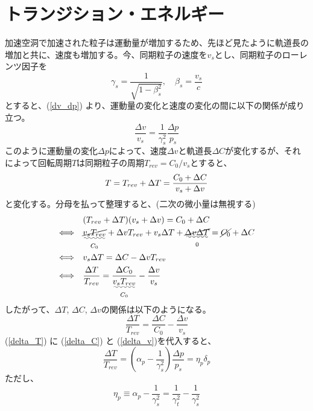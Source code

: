 \documentclass[]{jlreq}
\begin{document}
\section{トランジション・エネルギー}
加速空洞で加速された粒子は運動量が増加するため、先ほど見たように軌道長の増加と共に、速度も増加する。今、同期粒子の速度を$v_s$とし、同期粒子のローレンツ因子を
%
\begin{equation}
  \gamma_s = \frac{1}{\sqrt{1 - \beta_s^2}}, \quad \beta_s = \frac{v_s}{c}
\end{equation}
%
とすると、(\ref{dv_dp}) より、運動量の変化と速度の変化の間に以下の関係が成り立つ。
%
\begin{equation}
  \frac{\Delta v}{v_s}=\frac{1}{\gamma_s^2}\frac{\Delta p}{p_s}
  \label{delta_v}
\end{equation}
%
このように運動量の変化$\Delta p$によって、速度$\Delta v$と軌道長$\Delta C$が変化するが、それによって回転周期$T$は同期粒子の周期$T_{rev}=C_0/v_s$とすると、
%
\begin{equation}
  T = T_{rev} + \Delta T = \frac{C_0 + \Delta C}{v_s + \Delta v} \notag
\end{equation}
%
と変化する。分母を払って整理すると、(二次の微小量は無視する)
%
\begin{align}
  & (T_{rev} + \Delta T)(v_s + \Delta v) = C_0 + \Delta C \notag \\
  \Longleftrightarrow\quad & \underset{C_0}{\uwave{\cancel{v_s T_{rev}}}} + \Delta v T_{rev} + v_s \Delta T +
  \underset{0}{\uwave{\cancel{\Delta v \Delta T}}}
  = \cancel{C_0} + \Delta C \notag \\
  \Longleftrightarrow\quad & v_s \Delta T = \Delta C- \Delta v T_{rev} \notag \\
  \Longleftrightarrow\quad & \frac{\Delta T}{T_{rev}} = \frac{\Delta C_0}{\underset{C_0}{\uwave{v_s T_{rev}}}} - \frac{\Delta v}{v_s} \notag
\end{align}
%
したがって、$\Delta T$, $\Delta C$, $\Delta v$の関係は以下のようになる。
%
\begin{equation}
  \frac{\Delta T}{T_{rev}} = \frac{\Delta C}{C_0} - \frac{\Delta v}{v_s}
  \label{delta_T}
\end{equation}
%
(\ref{delta_T}) に (\ref{delta_C}) と (\ref{delta_v})を代入すると、
%
\begin{equation}
  \frac{\Delta T}{T_{rev}} = \left(\alpha_p - \frac{1}{\gamma_s^2}\right)\frac{\Delta p}{p_s} = \eta_p \delta_p
  \label{deltat_eta_deltap}
\end{equation}
%
ただし、
%
\begin{equation}
  \eta_p \equiv \alpha_p - \frac{1}{\gamma_s^2} = \frac{1}{\gamma_t^2} - \frac{1}{\gamma_s^2}
  \label{alppha_slip}
\end{equation}
\end{document}
